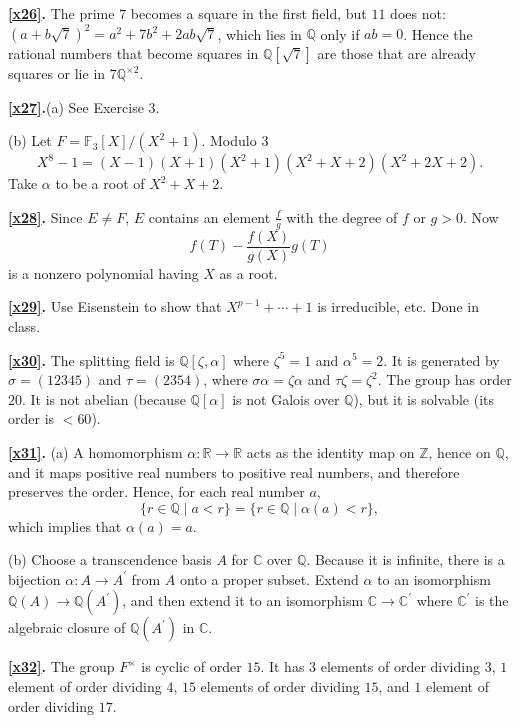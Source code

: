 \documentclass[a4paper,11pt,final,openany]{memoir}
\theoremstyle{nonumberplain}
\begin{document}
\medskip\noindent\textbf{\ref{x26}.} The prime $7$ becomes a square in the
first field, but $11$ does not: $(a+b\sqrt{7})^{2}=a^{2}+7b^{2}+2ab\sqrt{7}$,
which lies in ${\mathbb{Q}}$ only if $ab=0$. Hence the rational numbers that
become squares in ${\mathbb{Q}}[\sqrt{7}]$ are those that are already squares
or lie in $7{\mathbb{Q}}^{\times2}$.

\medskip\noindent\textbf{\ref{x27}.}(a) See Exercise 3.

(b) Let $F=\mathbb{F}_{3}[X]/(X^{2}+1)$. Modulo $3$
\[
X^{8}-1=(X-1)(X+1)(X^{2}+1)(X^{2}+X+2)(X^{2}+2X+2).
\]
Take $\alpha$ to be a root of $X^{2}+X+2$.

\medskip\noindent\textbf{\ref{x28}.} Since $E\neq F$, $E$ contains an element
$\frac{f}{g}$ with the degree of $f$ or $g>0$. Now
\[
f(T)-\frac{f(X)}{g(X)}g(T)
\]
is a nonzero polynomial having $X$ as a root.

\medskip\noindent\textbf{\ref{x29}.} Use Eisenstein to show that
$X^{p-1}+\cdots+1$ is irreducible, etc. Done in class.

\medskip\noindent\textbf{\ref{x30}.} The splitting field is ${\mathbb{Q}%
}[\zeta,\alpha]$ where $\zeta^{5}=1$ and $\alpha^{5}=2$. It is generated by
$\sigma=(12345)$ and $\tau=(2354)$, where $\sigma\alpha=\zeta\alpha$ and
$\tau\zeta=\zeta^{2}$. The group has order $20$. It is not abelian (because
${\mathbb{Q}}[\alpha]$ is not Galois over ${\mathbb{Q}}$), but it is solvable
(its order is $<60$).

\medskip\noindent\textbf{\ref{x31}.} (a) A homomorphism $\alpha\colon
\mathbb{R}{}\rightarrow\mathbb{R}{}$ acts as the identity map on $\mathbb{Z}%
{}$, hence on $\mathbb{Q}{}$, and it maps positive real numbers to positive
real numbers, and therefore preserves the order. Hence, for each real number
$a$,
\[
\{r\in{\mathbb{Q}}\mid a<r\}=\{r\in{\mathbb{Q}}\mid\alpha(a)<r\},
\]
which implies that $\alpha(a)=a$.

(b) Choose a transcendence basis $A$ for $\mathbb{C}$ over ${\mathbb{Q}}$.
Because it is infinite, there is a bijection $\alpha\colon A\rightarrow
A^{\prime}$ from $A$ onto a proper subset. Extend $\alpha$ to an isomorphism
${\mathbb{Q}}(A)\rightarrow{\mathbb{Q}}(A^{\prime})$, and then extend it to an
isomorphism $\mathbb{C}\rightarrow\mathbb{C}^{\prime}$ where $\mathbb{C}%
^{\prime}$ is the algebraic closure of ${\mathbb{Q}}(A^{\prime})$ in
$\mathbb{C}$.

\medskip\noindent\textbf{\ref{x32}.} The group $F^{\times}$ is cyclic of order
$15$. It has $3$ elements of order dividing $3$, $1$ element of order dividing
$4$, $15$ elements of order dividing $15$, and $1$ element of order dividing
$17$.
\end{document}
